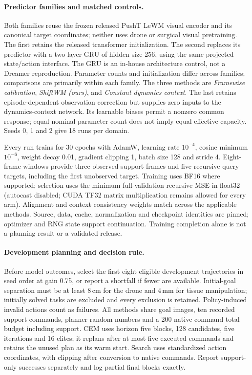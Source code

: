 \paragraph{Predictor families and matched controls.}
Both families reuse the frozen released PushT LeWM visual encoder and its
canonical target coordinates; neither uses drone or surgical visual
pretraining. The first retains the released transformer initialization.
The second replaces its predictor with a two-layer GRU of hidden size 256,
using the same projected state/action interface. The GRU is an in-house
architecture control, not a Dreamer reproduction. Parameter counts and
initialization differ across families; comparisons are primarily within
each family. The three methods are \emph{Framewise calibration},
\emph{ShiftWM (ours)}, and \emph{Constant dynamics context}. The last retains
episode-dependent observation correction but supplies zero inputs to the
dynamics-context network. Its learnable biases permit a nonzero common
response; equal nominal parameter count does not imply equal effective
capacity. Seeds 0, 1 and 2 give 18 runs per domain.

Every run trains for 30 epochs with AdamW, learning rate $10^{-4}$,
cosine minimum $10^{-6}$, weight decay 0.01, gradient clipping 1,
batch size 128 and stride 4. Eight-frame windows provide three observed
support frames and five recursive query targets, including the first
unobserved target. Training uses BF16 where supported; selection uses
the minimum full-validation recursive MSE in float32 (autocast disabled;
CUDA TF32 matrix multiplication remains allowed for every arm). Alignment and context
consistency weights match across the applicable methods. Source, data,
cache, normalization and checkpoint identities are pinned; optimizer and
RNG state support continuation. Training completion alone is not a
planning result or a validated release.

\paragraph{Development planning and decision rule.}
Before model outcomes, select the first eight eligible development
trajectories in seed order at gain 0.75, or report a shortfall if fewer
are available. Initial-goal separation must be at least 8\,cm for the drone
and 4\,mm for tissue manipulation; initially solved tasks are excluded
and every exclusion is retained. Policy-induced invalid actions count
as failures. All methods share goal images, ten recorded support commands,
planner random numbers and a 200-native-command total budget including
support. CEM uses horizon five blocks, 128 candidates, five iterations and
16 elites; it replans after at most five executed commands and retains
the unused plan as its warm start. Search uses standardized action
coordinates, with clipping after conversion to native commands. Report
support-only successes separately and log partial final blocks exactly.

